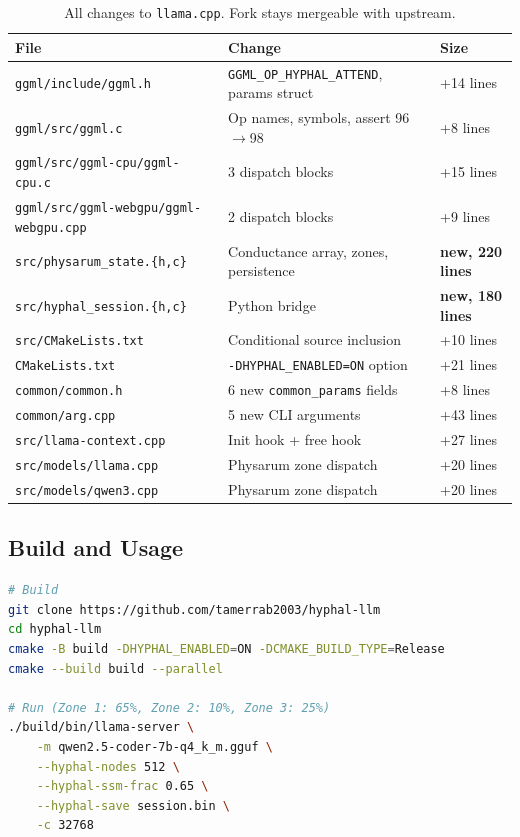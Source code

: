 \documentclass[11pt]{article}
\begin{document}
\begin{table}[h]
\centering
\small
\begin{tabular}{lll}
\toprule
File & Change & Size \\
\midrule
\texttt{ggml/include/ggml.h} & \texttt{GGML\_OP\_HYPHAL\_ATTEND}, params struct & +14 lines \\
\texttt{ggml/src/ggml.c} & Op names, symbols, assert 96$\to$98 & +8 lines \\
\texttt{ggml/src/ggml-cpu/ggml-cpu.c} & 3 dispatch blocks & +15 lines \\
\texttt{ggml/src/ggml-webgpu/ggml-webgpu.cpp} & 2 dispatch blocks & +9 lines \\
\texttt{src/physarum\_state.\{h,c\}} & Conductance array, zones, persistence & \textbf{new, 220 lines} \\
\texttt{src/hyphal\_session.\{h,c\}} & Python bridge & \textbf{new, 180 lines} \\
\texttt{src/CMakeLists.txt} & Conditional source inclusion & +10 lines \\
\texttt{CMakeLists.txt} & \texttt{-DHYPHAL\_ENABLED=ON} option & +21 lines \\
\texttt{common/common.h} & 6 new \texttt{common\_params} fields & +8 lines \\
\texttt{common/arg.cpp} & 5 new CLI arguments & +43 lines \\
\texttt{src/llama-context.cpp} & Init hook + free hook & +27 lines \\
\texttt{src/models/llama.cpp} & Physarum zone dispatch & +20 lines \\
\texttt{src/models/qwen3.cpp} & Physarum zone dispatch & +20 lines \\
\bottomrule
\end{tabular}
\caption{All changes to \texttt{llama.cpp}. Fork stays mergeable with upstream.}
\label{tab:changes}
\end{table}

\subsection{Build and Usage}

\begin{lstlisting}[language=bash]
# Build
git clone https://github.com/tamerrab2003/hyphal-llm
cd hyphal-llm
cmake -B build -DHYPHAL_ENABLED=ON -DCMAKE_BUILD_TYPE=Release
cmake --build build --parallel

# Run (Zone 1: 65%, Zone 2: 10%, Zone 3: 25%)
./build/bin/llama-server \
    -m qwen2.5-coder-7b-q4_k_m.gguf \
    --hyphal-nodes 512 \
    --hyphal-ssm-frac 0.65 \
    --hyphal-save session.bin \
    -c 32768
\end{lstlisting}
\end{document}
